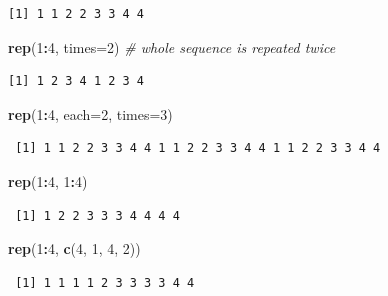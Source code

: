 \documentclass[
]{book}
\newenvironment{Shaded}{\begin{snugshade}}{\end{snugshade}}
\newcommand{\CommentTok}[1]{\textcolor[rgb]{0.56,0.35,0.01}{\textit{#1}}}
\newcommand{\DataTypeTok}[1]{\textcolor[rgb]{0.13,0.29,0.53}{#1}}
\newcommand{\DecValTok}[1]{\textcolor[rgb]{0.00,0.00,0.81}{#1}}
\newcommand{\KeywordTok}[1]{\textcolor[rgb]{0.13,0.29,0.53}{\textbf{#1}}}
\newcommand{\NormalTok}[1]{#1}
\newcommand{\OperatorTok}[1]{\textcolor[rgb]{0.81,0.36,0.00}{\textbf{#1}}}
\begin{document}
\begin{verbatim}
[1] 1 1 2 2 3 3 4 4
\end{verbatim}

\begin{Shaded}
\begin{Highlighting}[]
\KeywordTok{rep}\NormalTok{(}\DecValTok{1}\OperatorTok{:}\DecValTok{4}\NormalTok{, }\DataTypeTok{times=}\DecValTok{2}\NormalTok{) }\CommentTok{# whole sequence is repeated twice}
\end{Highlighting}
\end{Shaded}

\begin{verbatim}
[1] 1 2 3 4 1 2 3 4
\end{verbatim}

\begin{Shaded}
\begin{Highlighting}[]
\KeywordTok{rep}\NormalTok{(}\DecValTok{1}\OperatorTok{:}\DecValTok{4}\NormalTok{, }\DataTypeTok{each=}\DecValTok{2}\NormalTok{, }\DataTypeTok{times=}\DecValTok{3}\NormalTok{)}
\end{Highlighting}
\end{Shaded}

\begin{verbatim}
 [1] 1 1 2 2 3 3 4 4 1 1 2 2 3 3 4 4 1 1 2 2 3 3 4 4
\end{verbatim}

\begin{Shaded}
\begin{Highlighting}[]
\KeywordTok{rep}\NormalTok{(}\DecValTok{1}\OperatorTok{:}\DecValTok{4}\NormalTok{, }\DecValTok{1}\OperatorTok{:}\DecValTok{4}\NormalTok{)}
\end{Highlighting}
\end{Shaded}

\begin{verbatim}
 [1] 1 2 2 3 3 3 4 4 4 4
\end{verbatim}

\begin{Shaded}
\begin{Highlighting}[]
\KeywordTok{rep}\NormalTok{(}\DecValTok{1}\OperatorTok{:}\DecValTok{4}\NormalTok{, }\KeywordTok{c}\NormalTok{(}\DecValTok{4}\NormalTok{, }\DecValTok{1}\NormalTok{, }\DecValTok{4}\NormalTok{, }\DecValTok{2}\NormalTok{))}
\end{Highlighting}
\end{Shaded}

\begin{verbatim}
 [1] 1 1 1 1 2 3 3 3 3 4 4
\end{verbatim}
\end{document}

